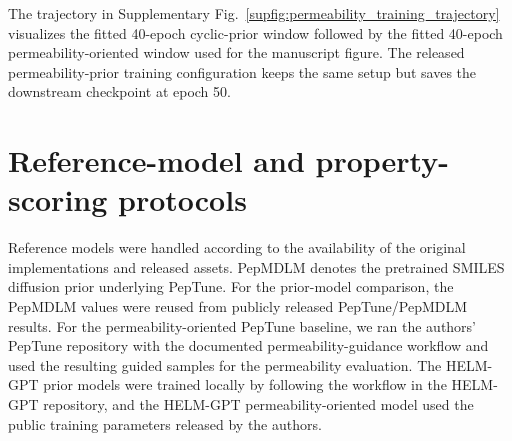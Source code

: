 \documentclass[12pt]{article}
\begin{document}
The trajectory in Supplementary Fig.~\ref{supfig:permeability_training_trajectory} visualizes the fitted 40-epoch cyclic-prior window followed by the fitted 40-epoch permeability-oriented window used for the manuscript figure.
The released permeability-prior training configuration keeps the same setup but saves the downstream checkpoint at epoch 50.

\section{Reference-model and property-scoring protocols}
\label{supsec:baseline_scoring}

Reference models were handled according to the availability of the original implementations and released assets.
PepMDLM denotes the pretrained SMILES diffusion prior underlying PepTune.
For the prior-model comparison, the PepMDLM values were reused from publicly released PepTune/PepMDLM results.
For the permeability-oriented PepTune baseline, we ran the authors' PepTune repository with the documented permeability-guidance workflow and used the resulting guided samples for the permeability evaluation.
The HELM-GPT prior models were trained locally by following the workflow in the HELM-GPT repository, and the HELM-GPT permeability-oriented model used the public training parameters released by the authors.
\end{document}
